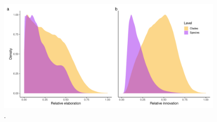 \documentclass[12pt,letterpaper]{article}
\providecommand{\DIFdelbegin}{} %
\providecommand{\DIFdelend}{} %
\providecommand{\DIFaddbeginFL}{} %
\providecommand{\DIFaddendFL}{} %
\providecommand{\DIFdelbeginFL}{} %
\providecommand{\DIFdelendFL}{} %
\newcommand{\DIFscaledelfig}{0.5}
\newlength{\DIFdelgraphicswidth} %
\newlength{\DIFdelgraphicsheight} %
\newcommand{\DIFaddincludegraphics}[2][]{{\color{blue}\fbox{\DIFOincludegraphics[#1]{#2}}}} %
\newcommand{\DIFdelincludegraphics}[2][]{%
\sbox{\DIFdelgraphicsbox}{\DIFOincludegraphics[#1]{#2}}%
\settoboxwidth{\DIFdelgraphicswidth}{\DIFdelgraphicsbox} %
\settoboxtotalheight{\DIFdelgraphicsheight}{\DIFdelgraphicsbox} %
\scalebox{\DIFscaledelfig}{%
\parbox[b]{\DIFdelgraphicswidth}{\usebox{\DIFdelgraphicsbox}\\[-\baselineskip] \rule{\DIFdelgraphicswidth}{0em}}\llap{\resizebox{\DIFdelgraphicswidth}{\DIFdelgraphicsheight}{%
\setlength{\unitlength}{\DIFdelgraphicswidth}%
\begin{picture}(1,1)%
\thicklines\linethickness{2pt} %
{\color[rgb]{1,0,0}\put(0,0){\framebox(1,1){}}}%
{\color[rgb]{1,0,0}\put(0,0){\line( 1,1){1}}}%
{\color[rgb]{1,0,0}\put(0,1){\line(1,-1){1}}}%
\end{picture}%
}\hspace*{3pt}}} %
} %
\DeclareRobustCommand{\DIFdelbegin}{\DIFOdelbegin \let\includegraphics\DIFdelincludegraphics} %
\DeclareRobustCommand{\DIFdelend}{\DIFOaddend \let\includegraphics\DIFOincludegraphics} %
\DeclareRobustCommand{\DIFaddbeginFL}{\DIFOaddbeginFL \let\includegraphics\DIFaddincludegraphics} %
\DeclareRobustCommand{\DIFaddendFL}{\DIFOaddendFL \let\includegraphics\DIFOincludegraphics} %
\DeclareRobustCommand{\DIFdelbeginFL}{\DIFOdelbeginFL \let\includegraphics\DIFdelincludegraphics} %
\DeclareRobustCommand{\DIFdelendFL}{\DIFOaddendFL \let\includegraphics\DIFOincludegraphics} %
\begin{document}
\begin{figure}[!htbp]
\centering
   \DIFdelbeginFL %
\DIFdelendFL \DIFaddbeginFL \includegraphics[width=1\textwidth]{Figures/relative_EI_gg_style_unscaled.pdf}
\DIFaddendFL \caption{.}
\label{Fig:relative_EI}
\end{figure}
\DIFdelbegin %

\DIFdelend \bigskip
\end{document}
